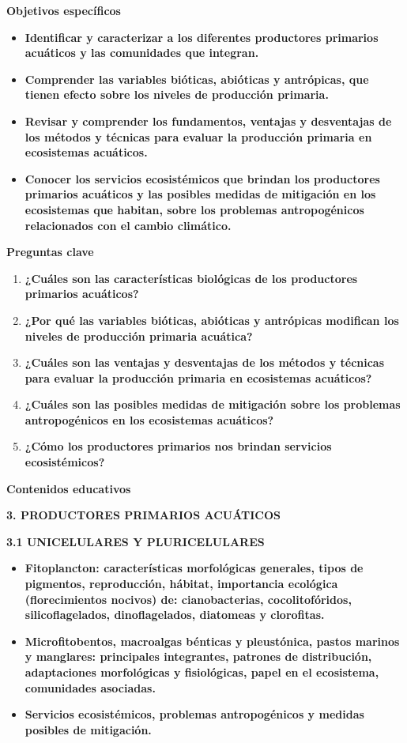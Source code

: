 \documentclass[
]{article}
\begin{document}
\textbf{Objetivos específicos}

\begin{itemize}
\item
  \textbf{Identificar y caracterizar a los diferentes productores
  primarios acuáticos y las comunidades que integran.}
\item
  \textbf{Comprender las variables bióticas, abióticas y antrópicas, que
  tienen efecto sobre los niveles de producción primaria.}
\item
  \textbf{Revisar y comprender los fundamentos, ventajas y desventajas
  de los métodos y técnicas para evaluar la producción primaria en
  ecosistemas acuáticos.}
\item
  \textbf{Conocer los servicios ecosistémicos que brindan los
  productores primarios acuáticos y las posibles medidas de mitigación
  en los ecosistemas que habitan, sobre los problemas antropogénicos
  relacionados con el cambio climático.}
\end{itemize}

\textbf{\hfill\break
}

\textbf{Preguntas clave}

\begin{enumerate}
\def\labelenumi{\arabic{enumi}.}
\item
  \textbf{¿Cuáles son las características biológicas de los productores
  primarios acuáticos?}
\item
  \textbf{¿Por qué las variables bióticas, abióticas y antrópicas
  modifican los niveles de producción primaria acuática?}
\item
  \textbf{¿Cuáles son las ventajas y desventajas de los métodos y
  técnicas para evaluar la producción primaria en ecosistemas
  acuáticos?}
\item
  \textbf{¿Cuáles son las posibles medidas de mitigación sobre los
  problemas antropogénicos en los ecosistemas acuáticos?}
\item
  \textbf{¿Cómo los productores primarios nos brindan servicios
  ecosistémicos?}
\end{enumerate}

\textbf{Contenidos educativos}

\textbf{3. PRODUCTORES PRIMARIOS ACUÁTICOS}

\textbf{3.1 UNICELULARES Y PLURICELULARES}

\begin{itemize}
\item
  \textbf{Fitoplancton: características morfológicas generales, tipos de
  pigmentos, reproducción, hábitat, importancia ecológica
  (florecimientos nocivos) de: cianobacterias, cocolitofóridos,
  silicoflagelados, dinoflagelados, diatomeas y clorofitas.}
\item
  \textbf{Microfitobentos, macroalgas bénticas y pleustónica, pastos
  marinos y manglares: principales integrantes, patrones de
  distribución, adaptaciones morfológicas y fisiológicas, papel en el
  ecosistema, comunidades asociadas.}
\item
  \textbf{Servicios ecosistémicos, problemas antropogénicos y medidas
  posibles de mitigación.}
\end{itemize}
\end{document}
